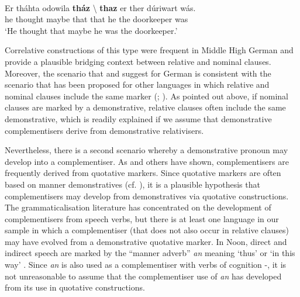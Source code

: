 \documentclass[output=paper,colorlinks,citecolor=brown]{langscibook}
\begin{document}
\ea\label{ex:diessel:23}
\\
\gll Er   tháhta   odowila   \textbf{tház} {\textbackslash}  \textbf{thaz}  er ther  dúriwart     wás.\\
     he   thought   maybe  that  {} that  he the  doorkeeper   was\\
\glt ‘He thought that maybe he was the doorkeeper.’
\z

Correlative constructions of this type were frequent in Middle High German and provide a plausible bridging context between relative and nominal clauses. Moreover, the scenario that \citeauthor{Axel2009} and \citeauthor{Lühr2008} suggest for German is consistent with the scenario that has been proposed for other languages in which relative and nominal clauses include the same marker (\citealt{Givón1991}; \citealt[248-254]{SchmidtkeBode2014}). As pointed out above, if nominal clauses are marked by a demonstrative, relative clauses often include the same demonstrative, which is readily explained if we assume that demonstrative complementisers derive from demonstrative relativisers.

Nevertheless, there is a second scenario whereby a demonstrative pronoun may develop into a complementiser. As \citet{Lord1993} and others have shown, complementisers are frequently derived from quotative markers. Since quotative markers are often based on manner demonstratives (cf. ), it is a plausible hypothesis that complementisers may develop from demonstratives via quotative constructions. The grammaticalisation literature has concentrated on the development of complementisers from speech verbs, but there is at least one language in our sample in which a complementiser (that does not also occur in relative clauses) may have evolved from a demonstrative quotative marker. In Noon, direct and indirect speech are marked by the “manner adverb” \textit{an} meaning ‘thus’ or ‘in this way’ . Since \textit{an} is also used as a complementiser with verbs of cognition -, it is not unreasonable to assume that the complementiser use of \textit{an} has developed from its use in quotative constructions.
\end{document}
